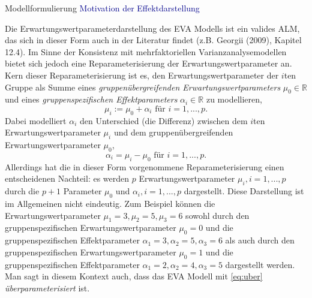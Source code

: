\documentclass[
  8pt,
  ignorenonframetext,
]{beamer}
\begin{document}
\begin{frame}{Modellformulierung}
\protect\hypertarget{modellformulierung-1}{}
\textcolor{darkblue}{Motivation der Effektdarstellung}

\footnotesize

Die Erwartungswertparameterdarstellung des EVA Modells ist ein valides
ALM, das sich in dieser Form auch in der Literatur findet (z.B. Georgii
(2009), Kapitel 12.4). Im Sinne der Konsistenz mit mehrfaktoriellen
Varianzanalysemodellen bietet sich jedoch eine Reparameterisierung der
Erwartungswertparameter an. Kern dieser Reparameterisierung ist es, den
Erwartungswertparameter der \(i\)ten Gruppe als Summe eines
\emph{gruppenübergreifenden Erwartungswertparameters}
\(\mu_0 \in \mathbb{R}\) und eines \emph{gruppenspezifischen
Effektparameters} \(\alpha_i \in \mathbb{R}\) zu modellieren,
\begin{equation}\label{eq:uber}
\mu_i := \mu_0 + \alpha_i \mbox{ für } i = 1,...,p.
\end{equation} Dabei modelliert \(\alpha_i\) den Unterschied (die
Differenz) zwischen dem \(i\)ten Erwartungswertparameter \(\mu_i\) und
dem gruppenübergreifenden Erwartungswertparameter \(\mu_0\),
\begin{equation}
\alpha_i = \mu_i - \mu_0 \mbox{ für } i = 1,...,p.
\end{equation} Allerdings hat die in dieser Form vorgenommene
Reparameterisierung einen entscheidenen Nachteil: es werden \(p\)
Erwartungswertparameter \(\mu_i, i = 1,...,p\) durch die \(p + 1\)
Parameter \(\mu_0\) und \(\alpha_i, i = 1,...,p\) dargestellt. Diese
Darstellung ist im Allgemeinen nicht eindeutig. Zum Beispiel können die
Erwartungswertparameter \(\mu_1 = 3, \mu_2 = 5, \mu_3 = 6\) sowohl durch
den gruppenspezifischen Erwartungswertparameter \(\mu_0 = 0\) und die
gruppenspezifischen Effektparameter
\(\alpha_1 = 3, \alpha_2 = 5, \alpha_3 = 6\) als auch durch den
gruppenspezifischen Erwartungswertparameter \(\mu_0 = 1\) und die
gruppenspezifischen Effektparameter
\(\alpha_1 = 2, \alpha_2 = 4, \alpha_3 = 5\) dargestellt werden. Man
sagt in diesem Kontext auch, dass das EVA Modell mit \eqref{eq:uber}
\emph{überparameterisiert} ist.
\end{frame}
\end{document}
